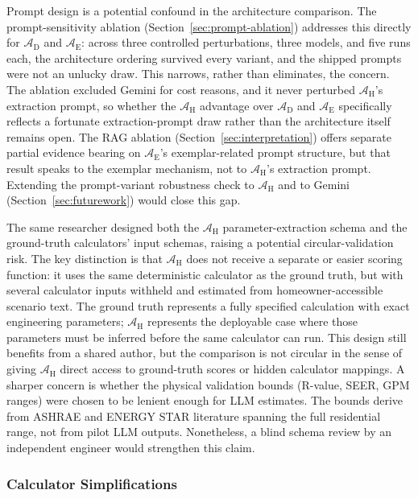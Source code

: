 \documentclass[final,3p,times]{elsarticle}
\begin{document}
Prompt design is a potential confound in the architecture comparison. The prompt-sensitivity ablation (Section~\ref{sec:prompt-ablation}) addresses this directly for $\mathcal{A}_{\text{D}}$ and $\mathcal{A}_{\text{E}}$: across three controlled perturbations, three models, and five runs each, the architecture ordering survived every variant, and the shipped prompts were not an unlucky draw. This narrows, rather than eliminates, the concern. The ablation excluded Gemini for cost reasons, and it never perturbed $\mathcal{A}_{\text{H}}$'s extraction prompt, so whether the $\mathcal{A}_{\text{H}}$ advantage over $\mathcal{A}_{\text{D}}$ and $\mathcal{A}_{\text{E}}$ specifically reflects a fortunate extraction-prompt draw rather than the architecture itself remains open. The RAG ablation (Section~\ref{sec:interpretation}) offers separate partial evidence bearing on $\mathcal{A}_{\text{E}}$'s exemplar-related prompt structure, but that result speaks to the exemplar mechanism, not to $\mathcal{A}_{\text{H}}$'s extraction prompt. Extending the prompt-variant robustness check to $\mathcal{A}_{\text{H}}$ and to Gemini (Section~\ref{sec:futurework}) would close this gap.

The same researcher designed both the $\mathcal{A}_{\text{H}}$ parameter-extraction schema and the ground-truth calculators' input schemas, raising a potential circular-validation risk. The key distinction is that $\mathcal{A}_{\text{H}}$ does not receive a separate or easier scoring function: it uses the same deterministic calculator as the ground truth, but with several calculator inputs withheld and estimated from homeowner-accessible scenario text. The ground truth represents a fully specified calculation with exact engineering parameters; $\mathcal{A}_{\text{H}}$ represents the deployable case where those parameters must be inferred before the same calculator can run. This design still benefits from a shared author, but the comparison is not circular in the sense of giving $\mathcal{A}_{\text{H}}$ direct access to ground-truth scores or hidden calculator mappings. A sharper concern is whether the physical validation bounds (R-value, SEER, GPM ranges) were chosen to be lenient enough for LLM estimates. The bounds derive from ASHRAE and ENERGY STAR literature spanning the full residential range, not from pilot LLM outputs. Nonetheless, a blind schema review by an independent engineer would strengthen this claim.

\subsubsection{Calculator Simplifications}
\label{sec:calculator-simplifications}
\end{document}
